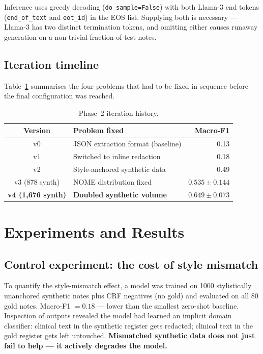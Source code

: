 \documentclass[11pt,a4paper]{article}
\begin{document}
Inference uses greedy decoding (\texttt{do\_sample=False}) with both Llama-3 end tokens (\texttt{end\_of\_text} and \texttt{eot\_id}) in the EOS list. Supplying both is necessary — Llama-3 has two distinct termination tokens, and omitting either causes runaway generation on a non-trivial fraction of test notes.

\subsection{Iteration timeline}

Table~\ref{tab:iterations} summarises the four problems that had to be fixed in sequence before the final configuration was reached.

\begin{table}[h]
\centering
\caption{Phase~2 iteration history.}
\label{tab:iterations}
\begin{tabular}{clr}
\toprule
Version & Problem fixed & Macro-F1 \\
\midrule
v0 & JSON extraction format (baseline) & 0.13 \\
v1 & Switched to inline redaction & 0.18 \\
v2 & Style-anchored synthetic data & 0.49 \\
v3 (878 synth) & NOME distribution fixed & $0.535 \pm 0.144$ \\
\textbf{v4 (1{,}676 synth)} & \textbf{Doubled synthetic volume} & $\mathbf{0.649 \pm 0.073}$ \\
\bottomrule
\end{tabular}
\end{table}

\section{Experiments and Results}
\label{sec:experiments}

\subsection{Control experiment: the cost of style mismatch}
\label{sec:style-experiment}

To quantify the style-mismatch effect, a model was trained on 1000 stylistically unanchored synthetic notes plus CRF negatives (no gold) and evaluated on all 80 gold notes. Macro-F1 $= 0.18$ — lower than the smallest zero-shot baseline. Inspection of outputs revealed the model had learned an implicit domain classifier: clinical text in the synthetic register gets redacted; clinical text in the gold register gets left untouched. \textbf{Mismatched synthetic data does not just fail to help — it actively degrades the model.}
\end{document}
